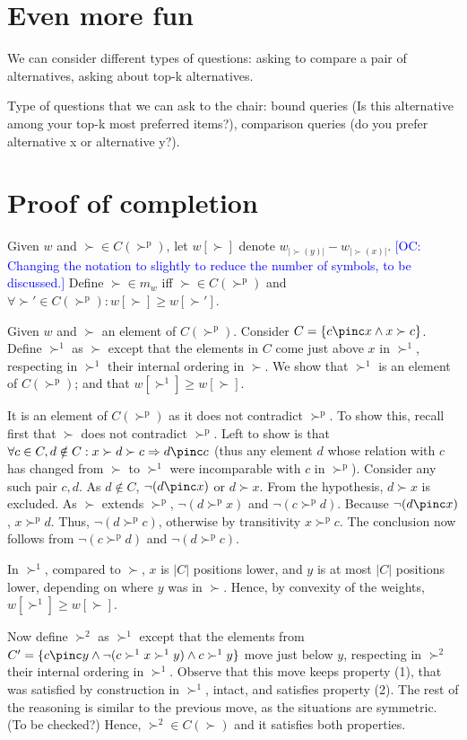 \documentclass[12pt]{article}
\newcommand{\commentOC}[1]{\textcolor{blue}{\small$\big[$OC: #1$\big]$}}
\newcommand{\pref}{\succ}%
\newcommand{\ppref}{\succ^\text{p}}%
\begin{document}
\section{Even more fun}
We can consider different types of questions: asking to compare a pair of alternatives, asking about top-k alternatives.

Type of questions that we can ask to the chair:
bound queries (Is this alternative among your top-k most preferred items?), comparison queries (do you prefer alternative x or alternative y?).

\section{Proof of completion}
\label{sec:prfCompl}
Given $w$ and ${\pref} \in C(\ppref)$, let $w[\pref]$ denote $w_{|\pref(y)|} - w_{|\pref(x)|}$. \commentOC{Changing the notation to slightly to reduce the number of symbols, to be discussed.} Define ${\pref} \in m_w$ iff ${\pref} \in C(\ppref)$ and $\forall {\pref'} \in C(\ppref): w[\pref] \geq w[\pref']$.

Given $w$ and $\pref$ an element of $C(\ppref)$. Consider $C = \{c \pinc x \land x \pref c\}$. Define $\pref^1$ as $\pref$ except that the elements in $C$ come just above $x$ in $\pref^1$, respecting in $\pref^1$ their internal ordering in $\pref$. We show that $\pref^1$ is an element of $C(\ppref)$; and that $w[\pref^1] \geq w[\pref]$. 

It is an element of $C(\ppref)$ as it does not contradict $\ppref$. To show this, recall first that $\pref$ does not contradict $\ppref$. Left to show is that $\forall c \in C, d \notin C: x \pref d \pref c \Rightarrow d \pinc c$ (thus any element $d$ whose relation with $c$ has changed from $\pref$ to $\pref^1$ were incomparable with $c$ in $\ppref$). Consider any such pair $c, d$. As $d \notin C$, $\lnot(d \pinc x)$ or $d \pref x$. From the hypothesis, $d \pref x$ is excluded. 
As $\pref$ extends $\ppref$, $\lnot(d \ppref x)$ and $\lnot (c \ppref d)$. Because $\lnot (d \pinc x)$, $x \ppref d$. Thus, $\lnot (d \ppref c)$, otherwise by transitivity $x \ppref c$. The conclusion now follows from $\lnot (c \ppref d)$ and $\lnot (d \ppref c)$.

In $\pref^1$, compared to $\pref$, $x$ is $|C|$ positions lower, and $y$ is at most $|C|$ positions lower, depending on where $y$ was in $\pref$. Hence, by convexity of the weights, $w[\pref^1] \geq w[\pref]$.

Now define $\pref^2$ as $\pref^1$ except that the elements from $C' = \{c \pinc y \land \lnot (c \pref^1 x \pref^1 y) \land c \pref^1 y\}$ move just below $y$, respecting in $\pref^2$ their internal ordering in $\pref^1$. Observe that this move keeps property (1), that was satisfied by construction in $\pref^1$, intact, and satisfies property (2). The rest of the reasoning is similar to the previous move, as the situations are symmetric. (To be checked?) Hence, $\pref^2 \in C(\pref)$ and it satisfies both properties.
\end{document}
